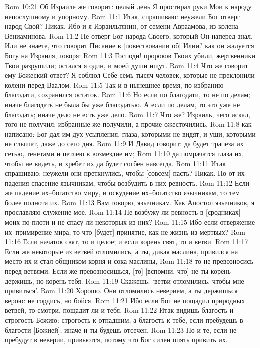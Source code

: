 Rom 10:21  Об Израиле же говорит: целый день Я простирал руки Мои к народу непослушному и упорному.
Rom 11:1  Итак, спрашиваю: неужели Бог отверг народ Свой? Никак. Ибо и я Израильтянин, от семени Авраамова, из колена Вениаминова.
Rom 11:2  Не отверг Бог народа Своего, который Он наперед знал. Или не знаете, что говорит Писание в [повествовании об] Илии? как он жалуется Богу на Израиля, говоря:
Rom 11:3  Господи! пророков Твоих убили, жертвенники Твои разрушили; остался я один, и моей души ищут.
Rom 11:4  Что же говорит ему Божеский ответ? Я соблюл Себе семь тысяч человек, которые не преклонили колени перед Ваалом.
Rom 11:5  Так и в нынешнее время, по избранию благодати, сохранился остаток.
Rom 11:6  Но если по благодати, то не по делам; иначе благодать не была бы уже благодатью. А если по делам, то это уже не благодать; иначе дело не есть уже дело.
Rom 11:7  Что же? Израиль, чего искал, того не получил; избранные же получили, а прочие ожесточились,
Rom 11:8  как написано: Бог дал им дух усыпления, глаза, которыми не видят, и уши, которыми не слышат, даже до сего дня.
Rom 11:9  И Давид говорит: да будет трапеза их сетью, тенетами и петлею в возмездие им;
Rom 11:10  да помрачатся глаза их, чтобы не видеть, и хребет их да будет согбен навсегда.
Rom 11:11  Итак спрашиваю: неужели они преткнулись, чтобы [совсем] пасть? Никак. Но от их падения спасение язычникам, чтобы возбудить в них ревность.
Rom 11:12  Если же падение их--богатство миру, и оскудение их--богатство язычникам, то тем более полнота их.
Rom 11:13  Вам говорю, язычникам. Как Апостол язычников, я прославляю служение мое.
Rom 11:14  Не возбужу ли ревность в [сродниках] моих по плоти и не спасу ли некоторых из них?
Rom 11:15  Ибо если отвержение их--примирение мира, то что [будет] принятие, как не жизнь из мертвых?
Rom 11:16  Если начаток свят, то и целое; и если корень свят, то и ветви.
Rom 11:17  Если же некоторые из ветвей отломились, а ты, дикая маслина, привился на место их и стал общником корня и сока маслины,
Rom 11:18  то не превозносись перед ветвями. Если же превозносишься, [то] [вспомни, что] не ты корень держишь, но корень тебя.
Rom 11:19  Скажешь: `ветви отломились, чтобы мне привиться'.
Rom 11:20  Хорошо. Они отломились неверием, а ты держишься верою: не гордись, но бойся.
Rom 11:21  Ибо если Бог не пощадил природных ветвей, то смотри, пощадит ли и тебя.
Rom 11:22  Итак видишь благость и строгость Божию: строгость к отпадшим, а благость к тебе, если пребудешь в благости [Божией]; иначе и ты будешь отсечен.
Rom 11:23  Но и те, если не пребудут в неверии, привьются, потому что Бог силен опять привить их.
